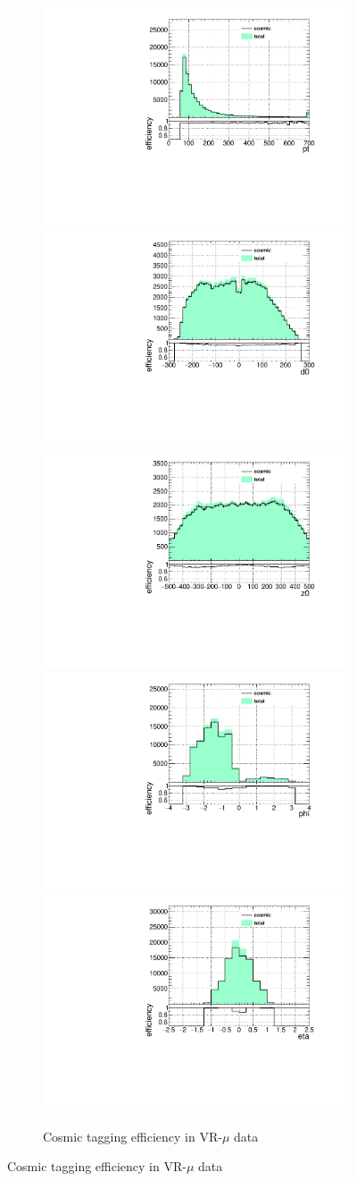 \begin{figure}[h]
  \centering
  \begin{subfigure}[b]{\textwidth}
  	\centering
  	\includegraphics[width=.3\textwidth]{figures/cosmics/wider_tag_ratio_pt.pdf}
  	\includegraphics[width=.3\textwidth]{figures/cosmics/wider_tag_ratio_d0.pdf}
  	\includegraphics[width=.3\textwidth]{figures/cosmics/wider_tag_ratio_z0.pdf}
  	\includegraphics[width=.3\textwidth]{figures/cosmics/wider_tag_ratio_phi.pdf}
  	\includegraphics[width=.3\textwidth]{figures/cosmics/wider_tag_ratio_eta.pdf}
  	\caption{Cosmic tagging efficiency in VR-$\mu$ data}
  \end{subfigure}


\end{figure}
